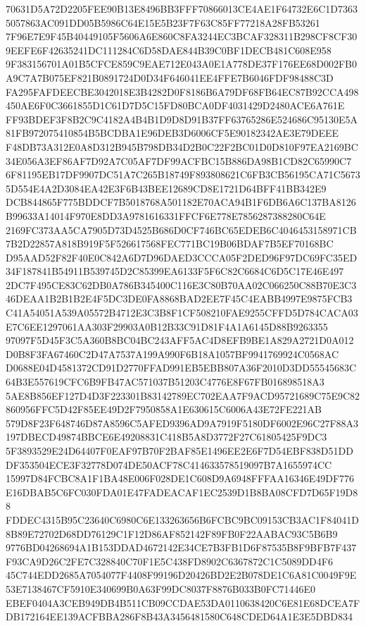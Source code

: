 \documentclass[UTF8,fontset=fandol,zihao=-4,a4paper]{ctexart}
\begin{document}
{{70631D5A72D2205FEE90B13E8496BB3FFF70866013CE4AE1F64732E6C1D73635057863AC091DD05B5986C64E15E5B23F7F63C85FF77218A28FB53261
7F96E7E9F45B40449105F5606A6E860C8FA3244EC3BCAF328311B298CF8CF309EEFE6F42635241DC111284C6D58DAE844B39C0BF1DECB481C608E958
9F383156701A01B5CFCE859C9EAE712E043A0E1A778DE37F176EE68D002FB0A9C7A7B075EF821B0891724D0D34F646041EE4FFE7B6046FDF98488C3D
FA295FAFDEECBE3042018E3B4282D0F8186B6A79DF68FB64EC87B92CCA498450AE6F0C3661855D1C61D7D5C15FD80BCA0DF4031429D2480ACE6A761E
FF93BDEF3F8B2C9C4182A4B4B1D9D8D91B37FF63765286E524686C95130E5A81FB972075410854B5BCDBA1E96DEB3D6006CF5E90182342AE3E79DEEE
F48DB73A312E0A8D312B945B798DB34D2B0C22F2BC01D0D810F97EA2169BC34E056A3EF86AF7D92A7C05AF7DF99ACFBC15B886DA98B1CD82C65990C7
6F81195EB17DF9907DC51A7C265B18749F893808621C6FB3CB56195CA71C56735D554E4A2D3084EA42E3F6B43BEE12689CD8E1721D64BFF41BB342E9
DCB844865F775BDDCF7B5018768A501182E70ACA94B1F6DB6A6C137BA8126B99633A14014F970E8DD3A9781616331FFCF6E778E7856287388280C64E
2169FC373AA5CA7905D73D4525B686D0CF746BC65EDEB6C4046453158971CB7B2D22857A818B919F5F526617568FEC771BC19B06BDAF7B5EF70168BC
D95AAD52F82F40E0C842A6D7D96DAED3CCCA05F2DED96F97DC69FC35ED34F187841B54911B539745D2C85399EA6133F5F6C82C6684C6D5C17E46E497
2DC7F495CE83C62DB0A786B345400C116E3C80B70AA02C066250C88B70E3C346DEAA1B2B1B2E4F5DC3DE0FA8868BAD2EE7F45C4EABB4997E9875FCB3
C41A54051A539A05572B4712E3C3B8F1CF508210FAE9255CFFD5D784CACA03E7C6EE1297061AA303F29903A0B12B33C91D81F4A1A6145D88B9263355
97097F5D45F3C5A360B8BC04BC243AFF5AC4D8EFB9BE1A829A2721D0A012D0B8F3FA67460C2D47A7537A199A990F6B18A1057BF9941769924C0568AC
D0688E04D4581372CD91D2770FFAD991EB5EBB807A36F2010D3DD55545683C64B3E557619CFC6B9FB47AC571037B51203C4776E8F67FB016898518A3
5AE8B856EF127D4D3F223301B83142789EC702EAA7F9ACD95721689C75E9C82860956FFC5D42F85EE49D2F7950858A1E630615C6006A43E72FE221AB
579D8F23F648746D87A8596C5AFED9396AD9A7919F5180DF6002E96C27F88A3197DBECD49874BBCE6E49208831C418B5A8D3772F27C61805425F9DC3
5F3893529E24D64407F0EAF97B70F2BAF85E1496EE2E6F7D54EBF838D51DDDF353504ECE3F32778D074DE50ACF78C414633578519097B7A1655974CC
15997D84FCBC8A1F1BA48E006F028DE1C608D9A6948FFFAA16346E49DF776E16DBAB5C6FC030FDA01E47FADEACAF1EC2539D1B8BA08CFD7D65F19D88
FDDEC4315B95C23640C6980C6E133263656B6FCBC9BC09153CB3AC1F84041D8B89E72702D68DD76129C1F12D86AF852142F89FB0F22AABAC93C5B6B9
9776BD04268694A1B153DDAD4672142E34CE7B3FB1D6F87535B8F9BFB7F437F93CA9D26C2FE7C328840C70F1E5C438FD8902C6367872C1C5089DD4F6
45C744EDD2685A7054077F4408F99196D20426BD2E2B078DE1C6A81C0049F9E53E7138467CF5910E340699B0A63F99DC8037F8876B033B0FC71446E0
EBEF0404A3CEB949DB4B511CB09CCDAE53DA0110638420C6E81E68DCEA7FDB172164EE139ACFBBA286F8B43A3456481580C648CDED64A1E3E5DBD834
}}
\end{document}

